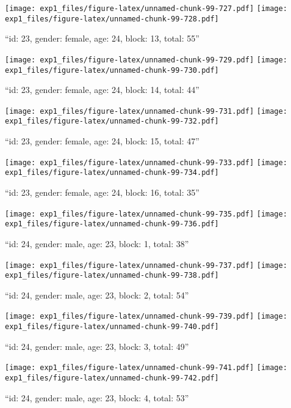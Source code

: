 \documentclass[,]{article}
\begin{document}
\texttt{[image: exp1\_files/figure-latex/unnamed-chunk-99-727.pdf]}
\texttt{[image: exp1\_files/figure-latex/unnamed-chunk-99-728.pdf]}

\newpage
[1] 

``id: 23, gender: female, age: 24, block: 13, total: 55''

\texttt{[image: exp1\_files/figure-latex/unnamed-chunk-99-729.pdf]}
\texttt{[image: exp1\_files/figure-latex/unnamed-chunk-99-730.pdf]}

\newpage
[1] 

``id: 23, gender: female, age: 24, block: 14, total: 44''

\texttt{[image: exp1\_files/figure-latex/unnamed-chunk-99-731.pdf]}
\texttt{[image: exp1\_files/figure-latex/unnamed-chunk-99-732.pdf]}

\newpage
[1] 

``id: 23, gender: female, age: 24, block: 15, total: 47''

\texttt{[image: exp1\_files/figure-latex/unnamed-chunk-99-733.pdf]}
\texttt{[image: exp1\_files/figure-latex/unnamed-chunk-99-734.pdf]}

\newpage
[1] 

``id: 23, gender: female, age: 24, block: 16, total: 35''

\texttt{[image: exp1\_files/figure-latex/unnamed-chunk-99-735.pdf]}
\texttt{[image: exp1\_files/figure-latex/unnamed-chunk-99-736.pdf]}

\newpage
[1] 

``id: 24, gender: male, age: 23, block: 1, total: 38''

\texttt{[image: exp1\_files/figure-latex/unnamed-chunk-99-737.pdf]}
\texttt{[image: exp1\_files/figure-latex/unnamed-chunk-99-738.pdf]}

\newpage
[1] 

``id: 24, gender: male, age: 23, block: 2, total: 54''

\texttt{[image: exp1\_files/figure-latex/unnamed-chunk-99-739.pdf]}
\texttt{[image: exp1\_files/figure-latex/unnamed-chunk-99-740.pdf]}

\newpage
[1] 

``id: 24, gender: male, age: 23, block: 3, total: 49''

\texttt{[image: exp1\_files/figure-latex/unnamed-chunk-99-741.pdf]}
\texttt{[image: exp1\_files/figure-latex/unnamed-chunk-99-742.pdf]}

\newpage
[1] 

``id: 24, gender: male, age: 23, block: 4, total: 53''
\end{document}
